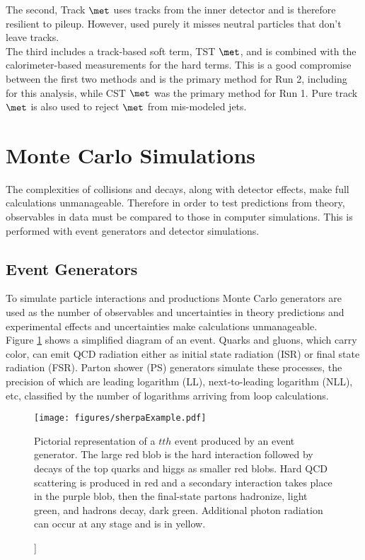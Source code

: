 The second, Track $\met$ uses tracks from the inner detector and is therefore resilient to pileup.  However, used purely it misses neutral particles that don't leave tracks. \\

The third includes a track-based soft term, TST $\met$, and is combined with the calorimeter-based measurements for the hard terms.  This is a good compromise between the first two methods and is the primary method for Run 2, including for this analysis, while CST $\met$ was the primary method for Run 1.  Pure track $\met$ is also used to reject $\met$ from mis-modeled jets.\\

\section{Monte Carlo Simulations}

The complexities of collisions and decays, along with detector effects, make full calculations unmanageable.  Therefore in order to test predictions from theory, observables in data must be compared to those in computer simulations.  This is performed with event generators and detector simulations.

\subsection{Event Generators}

To simulate particle interactions and productions Monte Carlo generators are used as the number of observables and uncertainties in theory predictions and experimental effects and uncertainties make calculations unmanageable.  \\

Figure \ref{fig:eventSherpa} shows a simplified diagram of an event.  Quarks and gluons, which carry color, can emit QCD radiation either as initial state radiation (ISR) or final state radiation (FSR).  Parton shower (PS) generators simulate these processes, the precision of which are leading logarithm (LL), next-to-leading logarithm (NLL), etc, classified by the number of logarithms arriving from loop calculations.  \\

\begin{figure}[!htb]
	\centering
	\texttt{[image: figures/sherpaExample.pdf]}
	\caption]{Pictorial representation of a $tth$ event produced by an event generator\cite{sherpa}.  The large red blob is the hard interaction followed by decays of the top quarks and higgs as smaller red blobs.  Hard QCD scattering is produced in red and a secondary interaction takes place in the purple blob, then the final-state partons hadronize, light green, and hadrons decay, dark green.  Additional photon radiation can occur at any stage and is in yellow.}
	\label{fig:eventSherpa}
\end{figure}


